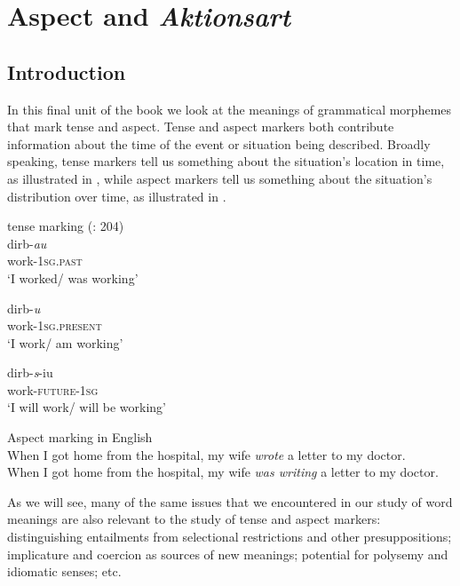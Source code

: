 \chapter{Aspect and \textit{Aktionsart}}\label{sec:20}

\section{Introduction}\label{sec:20.1}

In this final unit of the book we look at the meanings of grammatical morphemes that mark tense and aspect. Tense and aspect markers both contribute information about the time of the event or situation being described. Broadly speaking, tense markers tell us something about the situation’s location in time, as illustrated in , while aspect markers tell us something about the situation’s distribution over time, as illustrated in . 

\ea \label{ex:20.1}
{ tense marking} (\citealt{ChungTimberlake1985}: 204)\\
\ea 
\gll dirb-\textit{au}\\
work-\textsc{1sg}\textsc{.past} \\
\glt ‘I worked/ was working’

\ex
\gll  dirb-\textit{u}\\
work-\textsc{1sg}\textsc{.present} \\
\glt ‘I work/ am working’

\ex
\gll dirb-\textit{s}-iu\\
work-\textsc{future-}\textsc{1sg} \\
\glt ‘I will work/ will be working’\\
\z
\z

\ea \label{ex:20.2}
{Aspect marking in English}\\
\ea  When I got home from the hospital, my wife \textit{wrote} a letter to my doctor.\\
\ex When I got home from the hospital, my wife \textit{was writing} a letter to my doctor.
                       \z
\z


As we will see, many of the same issues that we encountered in our study of word meanings are also relevant to the study of tense and aspect markers: distinguishing entailments from selectional restrictions and other presuppositions; implicature and coercion as sources of new meanings; potential for polysemy and idiomatic senses; etc.



